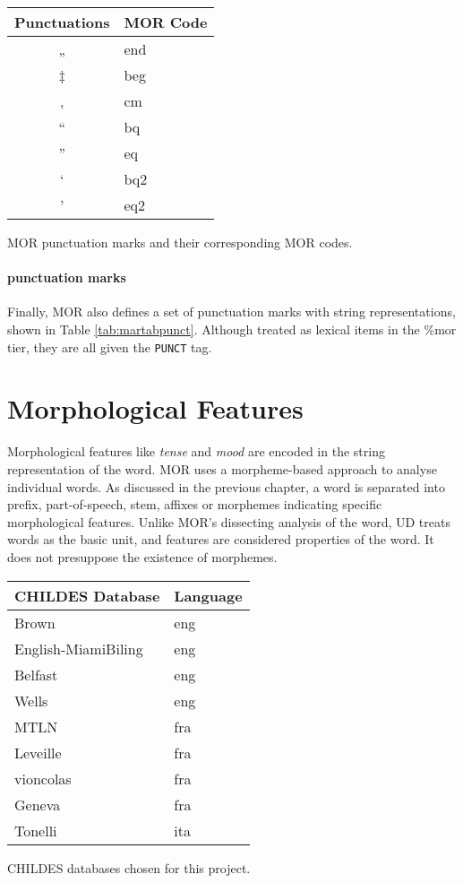 \begin{margintable}[1\baselineskip] %
\begin{tabularx}{0.85\textwidth}{@{}cl@{}}
\toprule
Punctuations & MOR Code\\\midrule
„ & end\\
‡ & beg\\
, & cm\\
“ & bq\\
” & eq\\
‘ & bq2\\
’ & eq2\\\bottomrule
\end{tabularx}
\caption{\label{tab:martabpunct}MOR punctuation marks and their corresponding MOR codes.}
\footnotesize
\end{margintable}

\paragraph{punctuation marks}
Finally, MOR also defines a set of punctuation marks with string representations, shown in Table \ref{tab:martabpunct}. Although treated as lexical items in the \%mor tier, they are all given the \texttt{PUNCT} tag.

\section{Morphological Features}
\label{sec:feats}

Morphological features like \emph{tense} and \emph{mood} are encoded in the string representation of the word. MOR uses a morpheme-based approach to analyse individual words. As discussed in the previous chapter, a word is separated into prefix, part-of-speech, stem, affixes or morphemes indicating specific morphological features. Unlike MOR's dissecting analysis of the word, UD treats words as the basic unit, and features are considered properties of the word. It does not presuppose the existence of morphemes.

\begin{margintable}[1\baselineskip]
\begin{tabularx}{1\textwidth}{@{}ll@{}}
\toprule
\textbf{CHILDES Database} & \textbf{Language}\\ \midrule
    Brown & eng\\
    English-MiamiBiling & eng\\
    Belfast & eng\\
    Wells & eng\\
    MTLN & fra\\
    Leveille & fra\\
    vioncolas & fra\\
    Geneva & fra\\
    Tonelli & ita\\\bottomrule
\end{tabularx}
\caption{\label{tab:martabdb}CHILDES databases chosen for this project.}
\footnotesize
\end{margintable}


